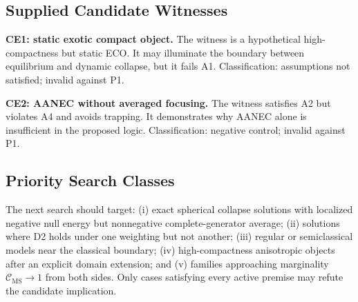 \documentclass[conference]{IEEEtran}
\newcommand{\Cms}{\mathcal{C}_{\mathrm{MS}}}
\begin{document}
\subsection{Supplied Candidate Witnesses}
\textbf{CE1: static exotic compact object.} The witness is a hypothetical high-compactness but static ECO. It may illuminate the boundary between equilibrium and dynamic collapse, but it fails A1. Classification: assumptions not satisfied; invalid against P1.

\textbf{CE2: AANEC without averaged focusing.} The witness satisfies A2 but violates A4 and avoids trapping. It demonstrates why AANEC alone is insufficient in the proposed logic. Classification: negative control; invalid against P1.

\subsection{Priority Search Classes}
The next search should target: (i) exact spherical collapse solutions with localized negative null energy but nonnegative complete-generator average; (ii) solutions where D2 holds under one weighting but not another; (iii) regular or semiclassical models near the classical boundary; (iv) high-compactness anisotropic objects after an explicit domain extension; and (v) families approaching marginality $\Cms\rightarrow1$ from both sides. Only cases satisfying every active premise may refute the candidate implication.
\end{document}
